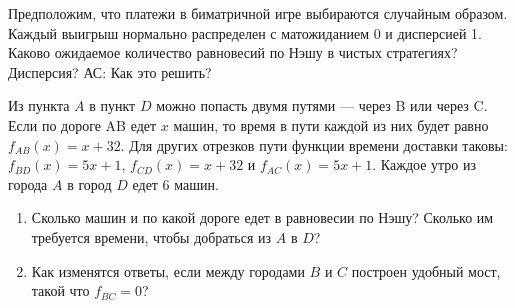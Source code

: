 
\begin{problem}
 Предположим, что платежи в биматричной игре выбираются случайным
образом. Каждый выигрыш нормально распределен с матожиданием 0 и
дисперсией 1. Каково ожидаемое количество равновесий по Нэшу в
чистых стратегиях? Дисперсия?
{\red АС: Как это решить?}
\begin{sol}

\end{sol}
\end{problem}




\begin{problem}[Мост]

Из пункта $A$ в пункт $D$ можно попасть двумя путями --- через B или
через C. Если по дороге AB едет $x$ машин, то время в пути каждой
из них будет равно $f_{AB}(x)=x+32$. Для других отрезков пути
функции времени доставки таковы: $f_{BD}(x)=5x+1$, $f_{CD}(x)=x+32$ и
$f_{AC}(x)=5x+1$.
Каждое утро из города $A$ в город $D$ едет 6 машин. \par
{}
\begin{enumerate}
\item Сколько машин и по какой дороге едет в равновесии по Нэшу?
Сколько им требуется времени, чтобы добраться из $A$ в $D$? \par
\item Как изменятся ответы, если между городами $B$ и $C$ построен
удобный мост, такой что $f_{BC}=0$?
\end{enumerate}


\begin{sol}

\end{sol}
\end{problem}

